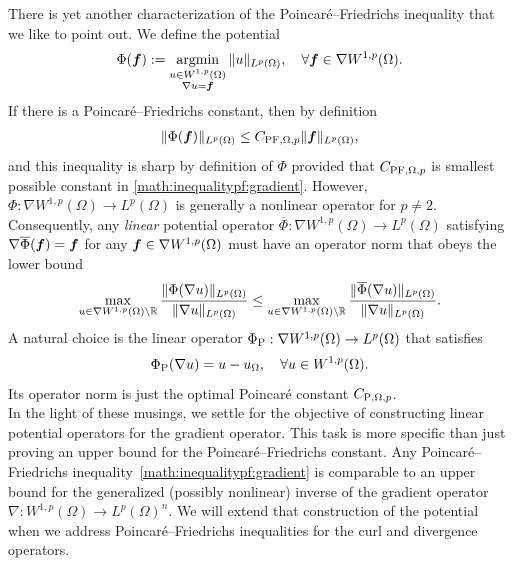 \documentclass[10pt,letterpaper]{article}
\begin{document}
There is yet another characterization of the Poincar\'e--Friedrichs inequality that we like to point out. 
We define the potential 
\begin{align*}
    \Phi( \bm{f} ) := \operatorname*{{\rm argmin}}\limits_{ \substack{ u \in W^{1,p}(\Omega) \\ \nabla u = \bm{f} } } \| u \|_{L^{p}(\Omega)},
    \quad 
    \forall 
    \bm{f} \in \nabla W^{1,p}(\Omega)
    .
\end{align*}
If there is a Poincar\'e--Friedrichs constant, then by definition
\begin{align*}
    \| \Phi(\bm{f}) \|_{L^{p}(\Omega)} \leq C_{{\rm PF},\Omega,p} \| \bm{f} \|_{L^{p}(\Omega)},
\end{align*}
and this inequality is sharp by definition of $\Phi$ provided that $C_{{\rm PF},\Omega,p}$ is smallest possible constant in \eqref{math:inequalitypf:gradient}. 
However, $\Phi : \nabla W^{1,p}(\Omega) \rightarrow L^{p}(\Omega)$ is generally a nonlinear operator for $p \neq 2$. 
Consequently, any \textit{linear} potential operator $\overline\Phi : \nabla W^{1,p}(\Omega) \rightarrow L^{p}(\Omega)$
satisfying $\nabla \overline\Phi( \bm{f} ) = \bm{f}$ for any $\bm{f} \in \nabla W^{1,p}(\Omega)$ must have an operator norm that obeys the lower bound 
\begin{align*}
    \max\limits_{ u \in \nabla W^{1,p}(\Omega) \setminus {\mathbb R} } 
    \frac{ \| \Phi(\nabla u) \|_{L^{p}(\Omega)} }{ \| \nabla u \|_{L^{p}(\Omega)} }
    \leq 
    \max\limits_{ u \in \nabla W^{1,p}(\Omega) \setminus {\mathbb R} } 
    \frac{ \| \overline\Phi(\nabla u) \|_{L^{p}(\Omega)} }{ \| \nabla u \|_{L^{p}(\Omega)} }
    .
\end{align*}
A natural choice is the linear operator $\Phi_{{\rm P}} : \nabla W^{1,p}(\Omega) \rightarrow L^{p}(\Omega)$ that satisfies 
\begin{align*}
    \Phi_{{\rm P}}( \nabla u ) = u - u_{\Omega},
    \quad 
    \forall 
    u \in W^{1,p}(\Omega)
    .
\end{align*}
Its operator norm is just the optimal Poincar\'e constant $C_{{\rm P},\Omega,p}$.
\\

In the light of these musings, we settle for the objective of constructing linear potential operators for the gradient operator.
This task is more specific than just proving an upper bound for the Poincar\'e--Friedrichs constant. 
Any Poincar\'e--Friedrichs inequality~\eqref{math:inequalitypf:gradient} is comparable to an upper bound for the generalized (possibly nonlinear) inverse of the gradient operator $\nabla : W^{1,p}(\Omega) \rightarrow L^{p}(\Omega)^{n}$. 
We will extend that construction of the potential when we address Poincar\'e--Friedrichs inequalities for the curl and divergence operators. 
\end{document}
